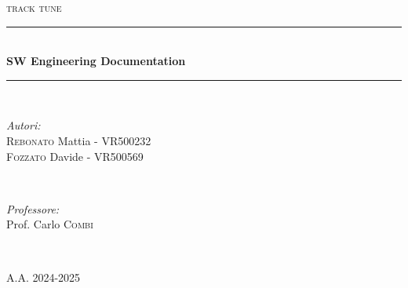 \begin{titlepage}
    $ $
    \vspace{5pt}
    \newcommand{\HRule}{\rule{\linewidth}{0.5mm}}
    \begin{center}
    \textsc{\normalsize track tune}\\[1cm]
    \end{center}
    
    \center
     
    
    \HRule \\[0.4cm]
    { \huge \bfseries SW Engineering Documentation}\\[0.4cm] %
    \HRule \\[1.5cm]
     
    
    \begin{minipage}{0.4\textwidth}
    \begin{flushleft} \large
    \emph{Autori:}\\
    \textsc{Rebonato} Mattia - VR500232\\
    \textsc{Fozzato} Davide - VR500569\\
    \end{flushleft}
    \end{minipage}
    ~
    \begin{minipage}{0.4\textwidth}
    \begin{flushright} \large
    \emph{Professore:} \\
    Prof. Carlo \textsc{Combi}
    \end{flushright}
    \end{minipage}\\[2cm]
    
    \vspace{250pt}
    
    \textsc{\normalsize A.A. 2024-2025}\\[0.5cm]
    
    \vfill %
    \end{titlepage}